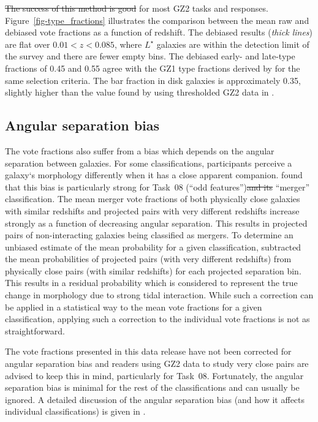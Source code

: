 \documentclass[useAMS,usenatbib]{mn2e}
\providecommand{\DIFaddtex}[1]{{\protect\color{blue}\uwave{#1}}} %
\providecommand{\DIFdeltex}[1]{{\protect\color{red}\sout{#1}}}                      %
\providecommand{\DIFaddbegin}{} %
\providecommand{\DIFaddend}{} %
\providecommand{\DIFdelbegin}{} %
\providecommand{\DIFdelend}{} %
\providecommand{\DIFadd}[1]{\texorpdfstring{\DIFaddtex{#1}}{#1}} %
\providecommand{\DIFdel}[1]{\texorpdfstring{\DIFdeltex{#1}}{}} %
\begin{document}
\DIFdelbegin \DIFdel{The success of this method is good }\DIFdelend \DIFaddbegin \DIFadd{This method is successful }\DIFaddend for most GZ2 tasks and responses. Figure~\ref{fig-type_fractions} illustrates the comparison between the mean raw and debiased vote fractions as a function of redshift. The debiased results ({\it thick lines}) are flat over $0.01<z<0.085$, where $L^\star$ galaxies \citep[$M_r\sim-20.44$;][]{bla03a} are within the detection limit of the survey and there are fewer empty bins. The debiased early- and late-type fractions of 0.45 and 0.55 agree with the GZ1 type fractions derived by \citet{bam09} for the same selection criteria. The bar fraction in disk galaxies is approximately 0.35, slightly higher than the value found by using thresholded GZ2 data in \citet{mas11c}.

\subsection{Angular separation bias}\label{ang-bias}

The vote fractions also suffer from a bias which depends on the angular separation between galaxies. For some classifications, participants perceive a galaxy`s morphology differently when it has a close apparent companion. \citet{cas13} found that this bias is particularly strong for Task~08 (``odd features'')\DIFdelbegin \DIFdel{and its }\DIFdelend \DIFaddbegin \DIFadd{, and in particular the }\DIFaddend ``merger'' classification. The mean merger vote fractions of both physically close galaxies with similar redshifts and projected pairs with very different redshifts increase strongly as a function of decreasing angular separation. This results in projected pairs of non-interacting galaxies being classified as mergers. To determine an unbiased estimate of the mean probability for a given classification, \citet{cas13} subtracted the mean probabilities of projected pairs (with very different redshifts) from physically close pairs (with similar redshifts) for each projected separation bin. This results in a residual probability which is considered to represent the true change in morphology due to strong tidal interaction. While such a correction can be applied in a statistical way to the mean vote fractions for a given classification, applying such a correction to the individual vote fractions is not as straightforward.

The vote fractions presented in this data release have not been corrected for angular separation bias and readers using GZ2 data to study very close pairs are advised to keep \DIFaddbegin \DIFadd{in }\DIFaddend this in mind, particularly for Task~08. Fortunately, the angular separation bias is minimal for the rest of the classifications and can usually be ignored. A detailed discussion of the angular separation bias (and how it affects individual classifications) is given in \citet{cas13}.
\end{document}
